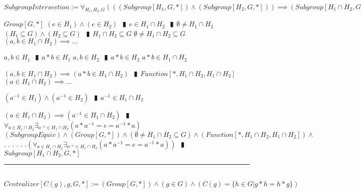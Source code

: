 \documentclass{book}
\newcommand{\abr}{:=}
\newcommand{\cont}{\phantom{.}. . .\phantom{.}}
\newcommand{\pipe}{$\phantom{(}\vrectangleblack\phantom{)}$}
\newcommand{\pr}[1]{\left(#1\right)}
\begin{document}
$SubgroupIntersection \abr \forall_{H_1, H_2, G}\pr{\pr{(Subgroup[H_1, G, *]) \land (Subgroup[H_2, G, *])} \implies (Subgroup[H_1 \cap H_2, G, *])}$
\begin{enumerate}
  \lit $Group[G, *]$
  \lit $(e \in H_1) \land (e \in H_2)$ \pipe $e \in H_1 \cap H_2$ \pipe $\emptyset \neq H_1 \cap H_2$
  \lit $(H_1 \subseteq G) \land (H_2 \subseteq G)$ \pipe $H_1 \cap H_2 \subseteq G$
  \lit $\emptyset \neq H_1 \cap H_2 \subseteq G$
  \lit $(a, b \in H_1 \cap H_2) \implies \ldots$
  \begin{enumerate}
    \lit $a, b \in H_1$ \pipe $a * b \in H_1$
    \lit $a, b \in H_2$ \pipe $a * b \in H_2$
    \lit $a * b \in H_1 \cap H_2$
  \end{enumerate}
  \lit $(a, b \in H_1 \cap H_2) \implies (a * b \in H_1 \cap H_2)$ \pipe $Function[*, H_1 \cap H_2, H_1 \cap H_2]$
  \lit $(a \in H_1 \cap H_2) \implies \ldots$
  \begin{enumerate}
    \lit $(a^{-1} \in H_1) \land (a^{-1} \in H_2)$ \pipe $a^{-1} \in H_1 \cap H_2$
  \end{enumerate}
  \lit $(a \in H_1 \cap H_2) \implies (a^{-1} \in H_1 \cap H_2)$ \pipe $\forall_{a \in H_1 \cap H_2} \exists_{a^{-1} \in H_1 \cap H_2}(a * a^{-1} = e = a^{-1} * a)$
  \lit $(SubgroupEquiv) \land (Group[G, *]) \land (\emptyset \neq H_1 \cap H_2 \subseteq G) \land (Function[*, H_1 \cap H_2, H_1 \cap H_2]) \land$ \cont
  \lit \cont $\pr{\forall_{a \in H_1 \cap H_2} \exists_{a^{-1} \in H_1 \cap H_2}(a * a^{-1} = e = a^{-1} * a)}$ \pipe $Subgroup[H_1 \cap H_2, G, *]$
\end{enumerate} \vspace{.75mm} \hrule \vspace{.75mm} \ \\ 

$Centralizer[C(g), g, G, *] \abr (Group[G, *]) \land (g \in G) \land \pr{C(g) = \{h \in G | g * h = h * g\}}$ \\
\end{document}
